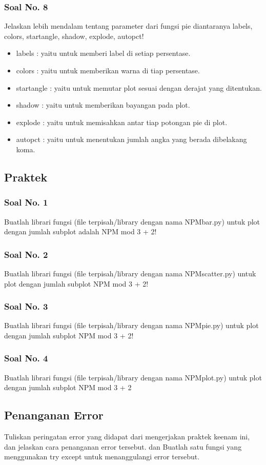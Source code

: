 \subsubsection{Soal No. 8}
\hfill \break
 Jelaskan lebih mendalam tentang parameter dari fungsi pie diantaranya labels, colors, startangle, shadow, explode, autopct!
 
 \begin{itemize}
 	\item labels : yaitu untuk memberi label di setiap persentase.
 	\item colors : yaitu untuk memberikan warna di tiap persentase.
 	\item startangle : yaitu untuk memutar plot sesuai dengan derajat yang ditentukan.
 	\item shadow : yaitu untuk memberikan bayangan pada plot.
 	\item explode : yaitu untuk memisahkan antar tiap potongan pie di plot.
 	\item autopct : yaitu untuk menentukan jumlah angka yang berada dibelakang koma.
 \end{itemize}

\subsection{Praktek}
\subsubsection{Soal No. 1}
\hfill \break
Buatlah librari fungsi (file terpisah/library dengan nama NPMbar.py) untuk plot dengan jumlah subplot adalah NPM mod 3 + 2!

\subsubsection{Soal No. 2}
\hfill \break
Buatlah librari fungsi (file terpisah/library dengan nama NPMscatter.py) untuk plot dengan jumlah subplot NPM mod 3 + 2!

\subsubsection{Soal No. 3}
\hfill \break
Buatlah librari fungsi (file terpisah/library dengan nama NPMpie.py) untuk plot dengan jumlah subplot NPM mod 3 + 2!

\subsubsection{Soal No. 4}
\hfill \break
Buatlah librari fungsi (file terpisah/library dengan nama NPMplot.py) untuk plot dengan jumlah subplot NPM mod 3 + 2


\subsection{Penanganan Error}
Tuliskan  peringatan  error  yang  didapat  dari  mengerjakan  praktek  keenam  ini, dan  jelaskan  cara  penanganan  error  tersebut. dan  Buatlah  satu  fungsi  yang menggunakan try except untuk menanggulangi error tersebut.
